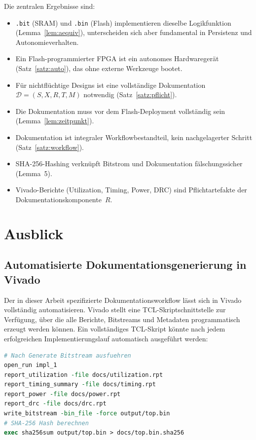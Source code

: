 ﻿\documentclass[a4paper,12pt]{article}
\theoremstyle{definition}
\begin{document}
Die zentralen Ergebnisse sind:
\begin{itemize}
    \item \texttt{.bit} (SRAM) und \texttt{.bin} (Flash) implementieren
          dieselbe Logikfunktion (Lemma~\ref{lem:aequiv}), unterscheiden sich
          aber fundamental in Persistenz und Autonomieverhalten.
    \item Ein Flash-programmierter FPGA ist ein autonomes Hardwaregerät
          (Satz~\ref{satz:auto}), das ohne externe Werkzeuge bootet.
    \item Für nichtflüchtige Designs ist eine vollständige Dokumentation
          $\mathcal{D} = (S, X, R, T, M)$ notwendig (Satz~\ref{satz:pflicht}).
    \item Die Dokumentation muss vor dem Flash-Deployment vollständig sein
          (Lemma~\ref{lem:zeitpunkt}).
    \item Dokumentation ist integraler Workflowbestandteil, kein nachgelagerter
          Schritt (Satz~\ref{satz:workflow}).
    \item SHA-256-Hashing verknüpft Bitstrom und Dokumentation
          fälschungssicher (Lemma~5).
    \item Vivado-Berichte (Utilization, Timing, Power, DRC) sind
          Pflichtartefakte der Dokumentationskomponente~$R$.
\end{itemize}

\section{Ausblick}
\label{sec:ausblick}

\subsection{Automatisierte Dokumentationsgenerierung in Vivado}

Der in dieser Arbeit spezifizierte Dokumentationsworkflow lässt sich in Vivado
vollständig automatisieren. Vivado stellt eine TCL-Skriptschnittstelle zur
Verfügung, über die alle Berichte, Bitstreams und Metadaten programmatisch
erzeugt werden können. Ein vollständiges TCL-Skript könnte nach jedem
erfolgreichen Implementierungslauf automatisch ausgeführt werden:

\begin{lstlisting}[language=tcl, caption={Automatisiertes Dokumentations-TCL-Skript}]
# Nach Generate Bitstream ausfuehren
open_run impl_1
report_utilization -file docs/utilization.rpt
report_timing_summary -file docs/timing.rpt
report_power -file docs/power.rpt
report_drc -file docs/drc.rpt
write_bitstream -bin_file -force output/top.bin
# SHA-256 Hash berechnen
exec sha256sum output/top.bin > docs/top.bin.sha256
\end{lstlisting}
\end{document}
